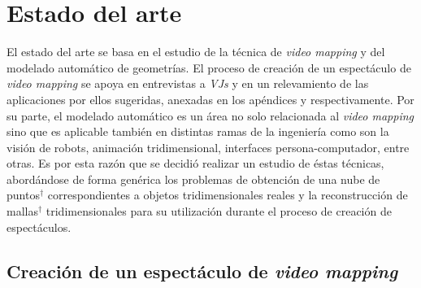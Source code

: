 \chapter{Estado del arte}

El estado del arte se basa en el estudio de la técnica de \emph{video mapping} y del modelado automático de geometrías.
El proceso de creación de un espectáculo de \emph{video mapping} se apoya en entrevistas a \emph{VJs} y en un relevamiento de las aplicaciones por ellos sugeridas, anexadas en los apéndices  y  respectivamente.
Por su parte, el modelado automático es un área no solo relacionada al \emph{video mapping} sino que es aplicable también en distintas ramas de la ingeniería como son la visión de robots, animación tridimensional, interfaces persona-computador, entre otras. Es por esta razón que se decidió realizar un estudio de éstas técnicas, abordándose de forma genérica los problemas de obtención de una nube de puntos$^\dagger$ correspondientes a objetos tridimensionales reales y la reconstrucción de mallas$^\dagger$ tridimensionales para su utilización durante el proceso de creación de espectáculos.

\section{Creación de un espectáculo de \emph{video mapping}}

